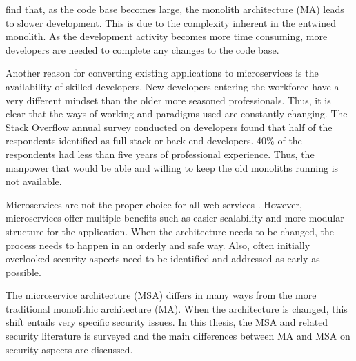 \begin{sloppypar}
    \citet{10.1007/978-3-319-74433-9_3} find that, as the code base becomes
    large, the monolith architecture (MA) leads to slower development. This is
    due to the complexity inherent in the entwined monolith. As the development
    activity becomes more time consuming, more developers are needed to complete
    any changes to the code base.
\end{sloppypar}
\begin{sloppypar}
    Another reason for converting existing applications to microservices is the
    availability of skilled developers. New developers entering the workforce
    have a very different mindset than the older more seasoned professionals.
    Thus, it is clear that the ways of working and paradigms used are constantly
    changing. The Stack Overflow annual survey \citep{sosurvey2019} conducted on
    developers found that half of the respondents identified as full-stack or
    back-end developers. 40\% of the respondents had less than five years of
    professional experience. Thus, the manpower that would be able and willing
    to keep the old monoliths running is not available.
\end{sloppypar}
\begin{sloppypar}
    Microservices are not the proper choice for all web services
    \citep{newman2019}. However, microservices offer multiple benefits such as
    easier scalability and more modular structure for the application. When the
    architecture needs to be changed, the process needs to happen in an orderly
    and safe way. Also, often initially overlooked security aspects need to be
    identified and addressed as early as possible.
\end{sloppypar}
\begin{sloppypar}
    The microservice architecture (MSA) differs in many ways from the more
    traditional monolithic architecture (MA). When the architecture is changed,
    this shift entails very specific security issues. In this thesis, the MSA and
    related security literature is surveyed and the main differences between MA
    and MSA on security aspects are discussed.
\end{sloppypar}

